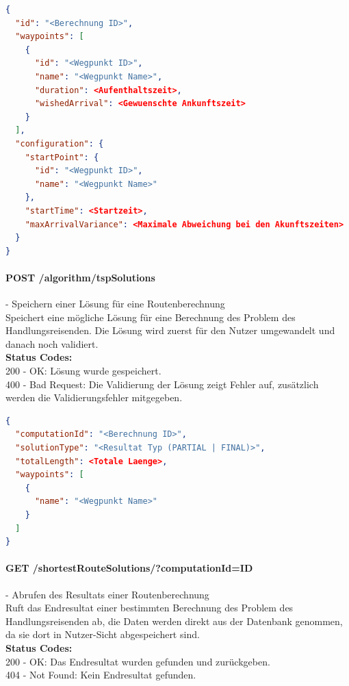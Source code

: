 \begin{lstlisting}[language=JSON, caption=Beispiel für Eingabedaten des Problem des Handlungsreisenden für den Algorithmus, label=lst:input_tsp_algo]  
{
  "id": "<Berechnung ID>",
  "waypoints": [
    {
      "id": "<Wegpunkt ID>",
      "name": "<Wegpunkt Name>",
      "duration": <Aufenthaltszeit>,
      "wishedArrival": <Gewuenschte Ankunftszeit>
    }
  ],
  "configuration": {
    "startPoint": {
      "id": "<Wegpunkt ID>",
      "name": "<Wegpunkt Name>"
    },
    "startTime": <Startzeit>,
    "maxArrivalVariance": <Maximale Abweichung bei den Akunftszeiten>
  }
}
\end{lstlisting}

\paragraph{POST /algorithm/tspSolutions} - Speichern einer Lösung für eine Routenberechnung\mbox{}\\
Speichert eine mögliche Lösung für eine Berechnung des Problem des Handlungsreisenden. Die Lösung wird zuerst für den Nutzer umgewandelt und danach noch validiert.\\
\textbf{Status Codes:}\\
200 - OK: Lösung wurde gespeichert.\\
400 - Bad Request: Die Validierung der Lösung zeigt Fehler auf, zusätzlich werden die Validierungsfehler mitgegeben.\\

\begin{lstlisting}[language=JSON, caption=Beispiel eines Resultates für das Problem des Handlungsreisenden aus Algorithmus-Sicht, label=lst:solution_tsp_algo]  
{
  "computationId": "<Berechnung ID>",
  "solutionType": "<Resultat Typ (PARTIAL | FINAL)>",
  "totalLength": <Totale Laenge>,
  "waypoints": [
    {
      "name": "<Wegpunkt Name>"
    }
  ]
}
\end{lstlisting}

\paragraph{GET /shortestRouteSolutions/?computationId={ID}} - Abrufen des Resultats einer Routenberechnung\mbox{}\\
Ruft das Endresultat einer bestimmten Berechnung des Problem des Handlungsreisenden ab, die Daten werden direkt aus der Datenbank genommen, da sie dort in Nutzer-Sicht abgespeichert sind.\\
\textbf{Status Codes:}\\
200 - OK: Das Endresultat wurden gefunden und zurückgeben.\\
404 - Not Found: Kein Endresultat gefunden.\\

